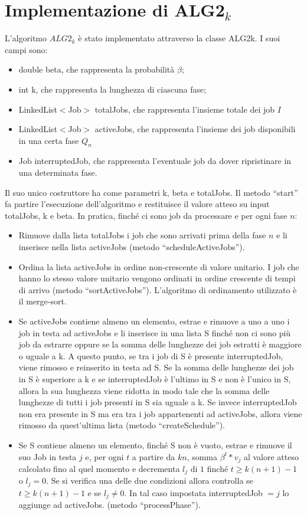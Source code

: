 \documentclass[twoside,openany,titlepage,fleqn,
	headinclude,12pt,a4paper,BCOR5mm,footinclude]{scrbook}
\begin{document}
\section{Implementazione di ALG2$_{k}$}
L’algoritmo $ALG2_{k}$ è stato implementato attraverso la classe ALG2k. I suoi campi sono:
\begin{itemize}
\item{double beta, che rappresenta la probabilità $\beta$;}
\item{int k, che rappresenta la lunghezza di ciascuna fase;}
\item{LinkedList$<$Job$>$ totalJobs, che rappresenta l’insieme totale dei job $I$}
\item{LinkedList$<$Job$>$ activeJobs, che rappresenta l’insieme dei job disponibili in una certa fase $Q_{n}$}
\item{Job interruptedJob, che rappresenta l’eventuale job da dover ripristinare in una determinata fase.}
\end{itemize}
Il suo unico costruttore ha come parametri k, beta e totalJobs. Il metodo “start” fa partire l’esecuzione dell’algoritmo e restituisce il valore atteso su input totalJobs, k e beta. In pratica, finché ci sono job da processare e per ogni fase $n$:
\begin{itemize}
\item{Rimuove dalla lista totalJobs i job che sono arrivati prima della fase $n$ e li inserisce nella lista activeJobs (metodo “scheduleActiveJobs”).}
\item{Ordina la lista activeJobs in ordine non-crescente di valore unitario. I job che hanno lo stesso valore unitario  vengono ordinati in ordine crescente di tempi di arrivo (metodo “sortActiveJobs”). L’algoritmo di ordinamento utilizzato è il merge-sort.}
\item{Se activeJobs contiene almeno un elemento, estrae e rimuove a uno a uno i job in testa ad activeJobs e li inserisce in una lista S finché non ci sono più job da estrarre oppure se la somma delle lunghezze dei job estratti è maggiore o uguale a k. A questo punto, se tra i job di S è presente interruptedJob, viene rimosso e reinserito in testa ad S. Se la somma delle lunghezze dei job in S è superiore a k e se interruptedJob è l’ultimo in S e non è l’unico in S, allora la sua lunghezza viene ridotta in modo tale che la somma delle lunghezze di tutti i job presenti in S sia uguale a k. Se invece interruptedJob non era presente in S ma era tra i job appartenenti ad activeJobs, allora viene rimosso da quest’ultima lista (metodo “createSchedule”).}
\item{Se S contiene almeno un elemento, finché S non è vuoto, estrae e rimuove il suo Job in testa $j$  e, per ogni $t$ a partire da $kn$, somma $\beta^{t} * v_{j}$ al valore atteso calcolato fino al quel momento e decrementa $l_{j}$ di $1$ finché $t \geq k(n + 1) - 1$ o $l_{j} = 0$. Se si verifica una delle due condizioni allora controlla se $t \geq k(n + 1) - 1$ e se  $l_{j} \neq 0$. In tal caso impostata interruptedJob $= j$ lo aggiunge ad activeJobs. (metodo “processPhase”).}
\end{itemize}
\end{document}
